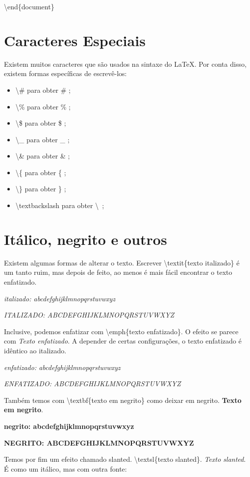 \documentclass[a4paper, 12pt, oneside]{book}
\begin{document}
\textbackslash end\{document\}

\section{Caracteres Especiais}
Existem muitos caracteres que são usados na sintaxe do \LaTeX.
Por conta disso, existem formas específicas de escrevê-los:
\begin{itemize}
\item \textbackslash \# para obter \# ;
\item \textbackslash \% para obter \% ;
\item \textbackslash \$ para obter \$ ;
\item \textbackslash \_ para obter \_ ;
\item \textbackslash \& para obter \& ;
\item \textbackslash \{ para obter \{ ;
\item \textbackslash \} para obter \} ;
\item \textbackslash textbackslash para obter \textbackslash\ ;
\end{itemize}

\section{Itálico, negrito e outros}
Existem algumas formas de alterar o texto.
Escrever \textbackslash textit\{texto italizado\} é um tanto ruim,
mas depois de feito, ao menos é mais fácil encontrar o texto enfatizado.

\textit{italizado: abcdefghijklmnopqrstuvwxyz}

\textit{ITALIZADO: ABCDEFGHIJKLMNOPQRSTUVWXYZ}

Inclusive, podemos enfatizar com \textbackslash emph\{texto enfatizado\}.
O efeito se parece com \emph{Texto enfatizado}.
A depender de certas configurações, o texto enfatizado é idêntico ao italizado.

\emph{enfatizado: abcdefghijklmnopqrstuvwxyz}

\emph{ENFATIZADO: ABCDEFGHIJKLMNOPQRSTUVWXYZ}

Também temos com \textbackslash textbf\{texto em negrito\} como deixar em negrito.
\textbf{Texto em negrito}.

\textbf{negrito: abcdefghijklmnopqrstuvwxyz}

\textbf{NEGRITO: ABCDEFGHIJKLMNOPQRSTUVWXYZ}

Temos por fim um efeito chamado slanted. \textbackslash textsl\{texto slanted\}.
\textsl{Texto slanted}. É como um itálico, mas com outra fonte:
\end{document}
